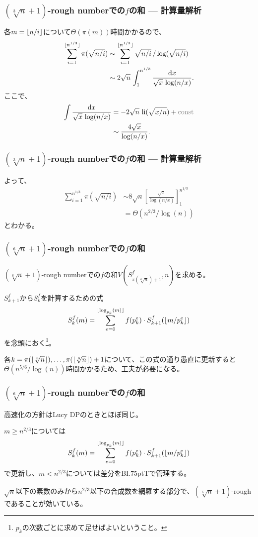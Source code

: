 \documentclass[
  lualatex,
  ja=standard,
  compress,
  hyperref={colorlinks, urlcolor=magenta, linkcolor=blue!55!black},
  dvipsnames,
  svgnames,
]{beamer}
\newcommand{\li}[1]{\operatorname{li}(#1)}
\newcommand{\IntC}{\text{\textcolor{gray}{const}}}
\newcommand{\BIT}{BI\kern.75ptT}
\begin{document}
\begin{frame}
  \frametitle{$(\sqrt[3]{n}+1)$-rough numberでの$f$の和 \theslidetopic{} — 計算量解析}

  各$m=\lfloor n/i\rfloor$について$\Theta(\pi(m))$時間かかるので、  
  $$
  \begin{aligned}
    \sum_{i=1}^{\lfloor n^{1/3}\rfloor} \pi(\sqrt{n/i})
    &\sim \sum_{i=1}^{\lfloor n^{1/3}\rfloor} \sqrt{n/i}\, / \log(\sqrt{n/i}) \\
    &\sim 2\sqrt{n}\,\int_{1}^{n^{1/3}} \frac{\mathrm{d}x}{\sqrt{x}\,\log(n/x)}.
  \end{aligned}
  $$
  ここで、
  $$
  \begin{aligned}
    \int\frac{\dd{x}}{\sqrt{x}\,\log(n/x)}
    &= -2\sqrt{n}\,\li{\sqrt{x/n}} + \IntC \\
    &\sim \frac{4\sqrt{x}}{\log(n/x)}.
  \end{aligned}
  $$
\end{frame}

\begin{frame}
  \frametitle{$(\sqrt[3]{n}+1)$-rough numberでの$f$の和 \theslidetopic{} — 計算量解析}

  よって、
  $$
  \begin{aligned}
    \sum_{i=1}^{n^{1/3}} \pi(\sqrt{n/i})
    &\sim 8\sqrt{n}\left[\frac{\sqrt{x}}{\log(n/x)}\right]_{1}^{n^{1/3}} \\
    &= \Theta(n^{2/3}/\log(n))
  \end{aligned}
  $$
  とわかる。
\end{frame}

\setcounter{slidetopic}{0}
\begin{frame}
  \frametitle{$(\sqrt[6]{n}+1)$-rough numberでの$f$の和 \theslidetopic}

  $(\sqrt[6]{n}+1)$-rough numberでの$f$の和$V(S_{\pi(\sqrt[6]{n})+1}^f, n)$を求める。

  $S_{k+1}^f$から$S_k^f$を計算するための式
  $$
  S_k^f(m) = \sum_{e=0}^{\lfloor\log_{p_k}(m)\rfloor} f(p_k^e)\cdot S_{k+1}^f(\lfloor m/p_k^e\rfloor)
  $$
  を念頭におく\footnote{$p_k$の次数ごとに求めて足せばよいということ。}。

  各$k=\pi(\lfloor\sqrt[3]{n}\rfloor),\dots, \pi(\lfloor\sqrt[6]{n}\rfloor)+1$について、この式の通り愚直に更新すると$\Theta(n^{5/6}/\log(n))$時間かかるため、工夫が必要になる。
\end{frame}

\begin{frame}
  \frametitle{$(\sqrt[6]{n}+1)$-rough numberでの$f$の和 \theslidetopic}

  高速化の方針はLucy DPのときとほぼ同じ。

  $m\ge n^{2/3}$については
  $$
  S_k^f(m) = \sum_{e=0}^{\lfloor\log_{p_k}(m)\rfloor} f(p_k^e)\cdot S_{k+1}^f(\lfloor m/p_k^e\rfloor)
  $$
  で更新し、$m<n^{2/3}$については差分を{\BIT}で管理する。

  $\sqrt{n}$以下の素数のみから$n^{2/3}$以下の合成数を網羅する部分で、$(\sqrt[6]{n}+1)$-roughであることが効いている。
\end{frame}
\end{document}
